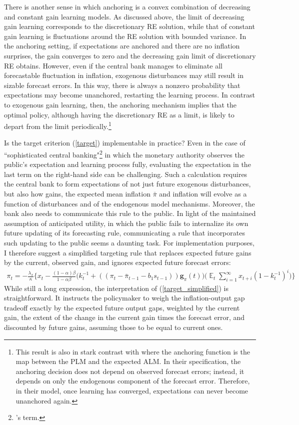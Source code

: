 \documentclass[11pt]{article}
\renewcommand{\[}{\begin{equation}}
\renewcommand{\]}{\end{equation}}
\DeclareMathOperator{\E}{\mathbb{E}}
\begin{document}
There is another sense in which anchoring is a convex combination of decreasing and constant gain learning models. As discussed above, the limit of decreasing gain learning corresponds to the discretionary RE solution, while that of constant gain learning is fluctuations around the RE solution with bounded variance. In the anchoring setting, if expectations are anchored and there are no inflation surprises, the gain converges to zero and the decreasing gain limit of discretionary RE obtains. However, even if the central bank manages to eliminate all forecastable fluctuation in inflation, exogenous disturbances may still result in sizable forecast errors. In this way, there is always a nonzero probability that expectations may become unanchored, restarting the learning process. In contrast to exogenous gain learning, then, the anchoring mechanism implies that the optimal policy, although having the discretionary RE as a limit, is likely to depart from the limit periodically.\footnote{This result is also in stark contrast with \cite{carvalho2019anchored} where the anchoring function is the map between the PLM and the expected ALM. In their specification, the anchoring decision does not depend on observed forecast errors; instead, it depends on only the endogenous component of the forecast error. Therefore, in their model, once learning has converged, expectations can never become unanchored again.}

Is the target criterion (\ref{target}) implementable in practice? Even in the case of ``sophisticated central banking"\footnote{\cite{gaspar2006adaptive}'s term.} in which the monetary authority observes the public's expectation and learning process fully, evaluating the expectation in the last term on the right-hand side can be challenging. Such a calculation requires the central bank to form expectations of not just future exogenous disturbances, but also how gains, the expected mean inflation $\bar{\pi}$ and inflation will evolve as a function of disturbances and of the endogenous model mechanisms. Moreover, the bank also needs to communicate this rule to the public. In light of the maintained assumption of anticipated utility, in which the public fails to internalize its own future updating of its forecasting rule, communicating a rule that incorporates such updating to the public seems a daunting task. For implementation purposes, I therefore suggest a simplified targeting rule that replaces expected future gains by the current, observed gain, and ignores expected future forecast errors:
\begin{align}
\pi_t  = -\frac{\lambda_x}{\kappa}\bigg\{x_t - \frac{(1-\alpha)\beta}{1-\alpha\beta} \bigg(k_t^{-1}+((\pi_t - \bar{\pi}_{t-1}-b_1 s_{t-1}))\mathbf{g}_{\pi}(t) \bigg) 
\bigg(\E_t\sum_{i=1}^{\infty}x_{t+i}(1-k_{t}^{-1})^{i} \bigg)
\bigg\} \label{target_simplified}
\end{align} 
While still a long expression, the interpretation of (\ref{target_simplified}) is straightforward. It instructs the policymaker to weigh the inflation-output gap tradeoff exactly by the expected future output gaps, weighted by the current gain, the extent of the change in the current gain times the forecast error, and discounted by future gains, assuming those to be equal to current ones. 
\end{document}
